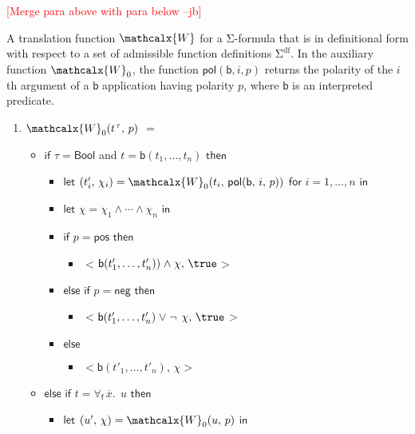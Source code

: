 \documentclass[runningheads,a4paper]{llncs}
\newcommand\return{}
\newcommand\bigtuple[1]{$\bigl<${#1}$\bigr>$}
\newcommand{\con}[1]{\mathsf{#1}}
\renewcommand\vec[1]{\overline{#1}}
\let\oldSigma=\Sigma
\def\Sigma{\mathrm{\oldSigma}}
\let\oldneg=\neg
\def\neg{\oldneg\:}
\let\oldvee=\vee
\def\vee{\mathrel{\oldvee}}
\let\oldwedge=\wedge
\def\wedge{\mathrel{\oldwedge}}
\newcommand{\conv}{\mathcalx{W}}
\newcommand{\sfundefs}[1]{#1^\mathrm{df}}
\newcommand{\ptrue}{\con{pos}}
\newcommand{\pfalse}{\con{neg}}
\newcommand{\pol}{\con{pol}}
\newcommand\ty[1]{\con{#1}}
\newcommand{\Bool}{\ty{Bool}}
\newcommand{\boolop}{\con{b}}
\newcommand{\forallf}[1]{\forall_{\!#1\:}}
\newcommand{\rem}[1]{\textcolor{red}{[#1]}}
\newcommand{\jb}[1]{\rem{#1 --jb}}
\newcommand{\vthinspace}{\kern+0.083333em}
\newcommand{\typ}[1]{^{\vthinspace #1}}
\begin{document}
\jb{Merge para above with para below}

A translation function $\conv$ for a $\Sigma$-formula that is in definitional
form with respect to a set of admissible function definitions
$\sfundefs{\Sigma}$. In the auxiliary function $\conv_0$, the function $\pol(
\boolop, i, p )$ returns the polarity of the $i${th} argument of a
$\boolop$ application having polarity $p$, where $\boolop$ is an interpreted
predicate.

\begin{enumerate}
\item[\ ] 
$\conv_0( t\typ{\tau},\, p )$ $=$
 \begin{itemize}
   \item[] $\mathsf{if}$ $\tau = \Bool$ and $t = \boolop(t_1,\ldots,t_n)$ $\mathsf{then}$
    \begin{itemize}
      \item[] $\mathsf{let}$ $( t'_i,\, \chi_i ) = \conv_0( t_i,\, \pol( \boolop,\, i,\, p ) )$ $\mathsf{for}$ $i = 1, \ldots, n$ $\mathsf{in}$
      \item[] $\mathsf{let}$ $\chi = \chi_1 \wedge \cdots \wedge \chi_n$ $\mathsf{in}$
      \item[] $\mathsf{if}$ $p = \ptrue$ $\mathsf{then}$
      \begin{itemize}
        \item[] \return \bigtuple{$\boolop(t'_1, \ldots, t'_n) ) \wedge \chi,\, \true$}
      \end{itemize}
      \item[] $\mathsf{else}$ $\mathsf{if}$ $p = \pfalse$ $\mathsf{then}$
      \begin{itemize}
        \item[] \return \bigtuple{$\boolop(t'_1, \ldots, t'_n) \vee \neg \chi,\, \true$}
      \end{itemize}
      \item[] $\mathsf{else}$
      \begin{itemize}
        \item[] \return \bigtuple{$\boolop(t'_1, \ldots, t'_n),\, \chi$}
      \end{itemize}
    \end{itemize}
  \item[] $\mathsf{else}$ $\mathsf{if}$ $t = \forallf{\con{f}} \vec x.\;\, u$ $\mathsf{then}$
    \begin{itemize}
      \item[] $\mathsf{let}$ $( u',\, \chi ) = \conv_0( u,\, p )$ $\mathsf{in}$

\end{itemize}
\end{itemize}
\end{enumerate}
\end{document}
